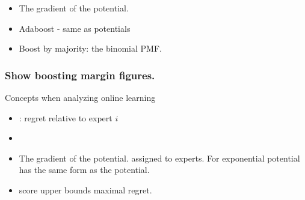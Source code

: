 \documentclass{beamer}
\begin{document}
\begin{frame}
  \begin{itemize}
   \item {} The gradient of the potential.
   \item Adaboost - same as potentials
     \item Boost by majority: the binomial PMF.
  \end{itemize}
\end{frame}
\begin{frame}
  \frametitle{Show boosting margin figures.}
  
\end{frame}


\begin{frame}{Concepts when analyzing online learning}
  \begin{itemize}
   \item {} : regret relative to expert $i$
   \item {}
  \item {} The gradient of the potential. assigned to experts. For exponential potential has the same form as the potential.
  \item score upper bounds maximal regret.
  \end{itemize}
\end{frame}

  
\end{document}
